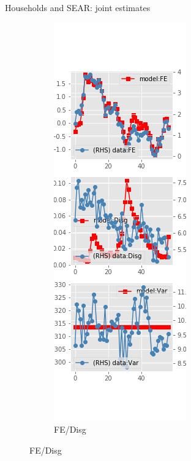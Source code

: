 \documentclass{beamer}
\begin{document}
\begin{frame}{Households and SEAR: joint estimates}
\begin{figure}[ht]
\begin{subfigure}[b]{0.2\textwidth}
		\end{subfigure}
		\hfill
		\begin{subfigure}[b]{0.2\textwidth}
			\caption{FE/Disg}
			\includegraphics[width=\textwidth, height = 0.8\textheight]{figuresDraft/sce_se_est_diag2.png}

\end{subfigure}
\end{figure}
\end{frame}
\end{document}
